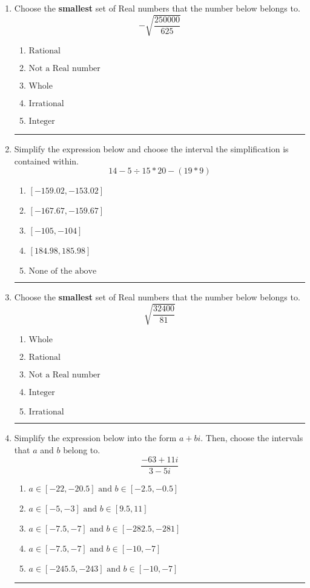\documentclass[14pt]{extbook}
\newcommand{\litem}[1]{\item#1\hspace*{-1cm}\rule{\textwidth}{0.4pt}}
\begin{document}
\begin{enumerate}
\litem{
Choose the \textbf{smallest} set of Real numbers that the number below belongs to.\[ -\sqrt{\frac{250000}{625}} \]\begin{enumerate}[label=\Alph*.]
\item \( \text{Rational} \)
\item \( \text{Not a Real number} \)
\item \( \text{Whole} \)
\item \( \text{Irrational} \)
\item \( \text{Integer} \)

\end{enumerate} }
\litem{
Simplify the expression below and choose the interval the simplification is contained within.\[ 14 - 5 \div 15 * 20 - (19 * 9) \]\begin{enumerate}[label=\Alph*.]
\item \( [-159.02, -153.02] \)
\item \( [-167.67, -159.67] \)
\item \( [-105, -104] \)
\item \( [184.98, 185.98] \)
\item \( \text{None of the above} \)

\end{enumerate} }
\litem{
Choose the \textbf{smallest} set of Real numbers that the number below belongs to.\[ \sqrt{\frac{32400}{81}} \]\begin{enumerate}[label=\Alph*.]
\item \( \text{Whole} \)
\item \( \text{Rational} \)
\item \( \text{Not a Real number} \)
\item \( \text{Integer} \)
\item \( \text{Irrational} \)

\end{enumerate} }
\litem{
Simplify the expression below into the form $a+bi$. Then, choose the intervals that $a$ and $b$ belong to.\[ \frac{-63 + 11 i}{3 - 5 i} \]\begin{enumerate}[label=\Alph*.]
\item \( a \in [-22, -20.5] \text{ and } b \in [-2.5, -0.5] \)
\item \( a \in [-5, -3] \text{ and } b \in [9.5, 11] \)
\item \( a \in [-7.5, -7] \text{ and } b \in [-282.5, -281] \)
\item \( a \in [-7.5, -7] \text{ and } b \in [-10, -7] \)
\item \( a \in [-245.5, -243] \text{ and } b \in [-10, -7] \)


\end{enumerate}}
\end{enumerate}
\end{document}
